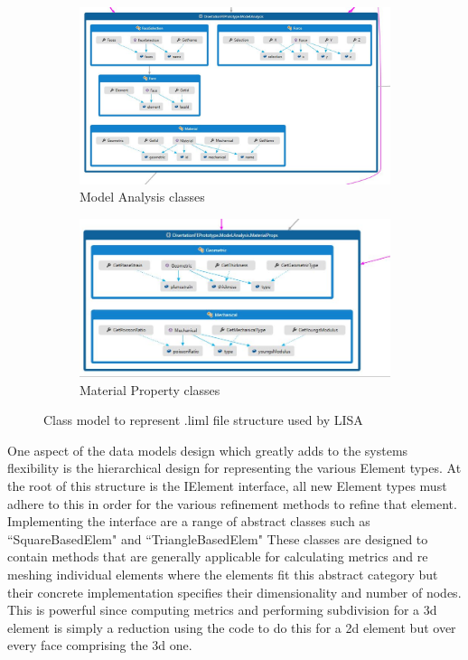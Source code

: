 \begin{figure}
\centering
\begin{subfigure}{.5\textwidth}
  \centering
  \includegraphics[width=0.9\linewidth]{../Graphics/DissoFEProto-ModelAnalysis.jpg}
  \caption{Model Analysis classes}
  \label{fig:sub1}
\end{subfigure}%
\begin{subfigure}{.5\textwidth}
  \centering
  \includegraphics[width=0.9\linewidth]{../Graphics/DissoFEProto-MaterialProps.jpg}
  \caption{Material Property classes}
  \label{fig:sub2}
\end{subfigure}
\label{fig:test}
\caption{Class model to represent .liml file structure used by LISA}
\end{figure}

\noindent
One aspect of the data models design which greatly adds to the systems flexibility is the hierarchical design for representing the various Element types. At the root of this structure is the IElement interface, all new Element types must adhere to this in order for the various refinement methods to refine that element. Implementing the interface are a range of abstract classes such as ``SquareBasedElem" and ``TriangleBasedElem" These classes are designed to contain methods that are generally applicable for calculating metrics and re meshing individual elements where the elements fit this abstract category but their concrete implementation specifies their dimensionality and number of nodes. This is powerful since computing metrics and performing subdivision for a 3d element is simply a reduction using the code to do this for a 2d element but over every face comprising the 3d one. \\ 

